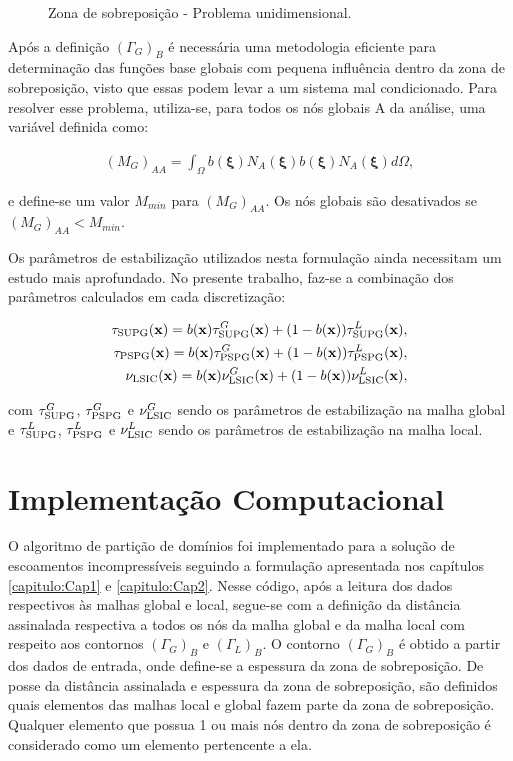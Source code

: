 \documentclass[tese_patricia]{subfiles}
\begin{document}
\begin{figure}[!htb]
	\caption{Zona de sobreposição - Problema unidimensional. }
	\label{fig:ZonadeSobreposicao}
\end{figure}


Após a definição $(\Gamma_{G})_{B}$ é necessária uma metodologia eficiente para determinação das funções base globais com pequena influência dentro da zona de sobreposição, visto que essas podem levar a um sistema mal condicionado. Para resolver esse problema, utiliza-se, para todos os n\'os globais A da análise, uma variável definida como:

\begin{align}
(M_{G})_{AA} = \int_{\Omega}b(\bm{\xi})N_{A}(\bm{\xi})b(\bm{\xi})N_{A}(\bm{\xi})d\Omega, \label{eq:influence}
\end{align}

\noindent e define-se um valor $M_{min}$ para $(M_{G})_{AA}$. Os n\'os globais s\~ao desativados se $(M_{G})_{AA} < M_{min}$.

Os parâmetros de estabilização utilizados nesta formulação ainda necessitam um estudo mais aprofundado. No presente trabalho, faz-se a combinação dos parâmetros calculados em cada discretização:

\begin{align}
\tau_{\mathrm{SUPG}}(\mathbf{x}) =  b(\mathbf{x})\tau_{\mathrm{SUPG}}^{G}(\mathbf{x}) + (1-b(\mathbf{x}))\tau_{\mathrm{SUPG}}^{L}(\mathbf{x}),\\
\tau_{\mathrm{PSPG}}(\mathbf{x}) =  b(\mathbf{x})\tau_{\mathrm{PSPG}}^{G}(\mathbf{x}) + (1-b(\mathbf{x}))\tau_{\mathrm{PSPG}}^{L}(\mathbf{x}),\\
\nu_{\mathrm{LSIC}}(\mathbf{x}) =  b(\mathbf{x})\nu_{\mathrm{LSIC}}^{G}(\mathbf{x}) + (1-b(\mathbf{x}))\nu_{\mathrm{LSIC}}^{L}(\mathbf{x}),
\end{align}

\noindent com $\tau_{\mathrm{SUPG}}^{G}$, $\tau_{\mathrm{PSPG}}^{G}$ e $\nu_{\mathrm{LSIC}}^{G}$ sendo os parâmetros de estabilização na malha global e $\tau_{\mathrm{SUPG}}^{L}$, $\tau_{\mathrm{PSPG}}^{L}$ e  $\nu_{\mathrm{LSIC}}^{L}$ sendo os parâmetros de estabilização na malha local.


\section{Implementação Computacional}

O algoritmo de partição de domínios foi implementado para a solução de escoamentos incompressíveis seguindo a formulação apresentada nos capítulos \ref{capitulo:Cap1} e \ref{capitulo:Cap2}. Nesse código, após a leitura dos dados respectivos às malhas global e local, segue-se com a definição da distância assinalada respectiva a todos os nós da malha global e da malha local com respeito aos contornos $(\Gamma_{G})_{B}$ e $(\Gamma_{L})_{B}$. O contorno  $(\Gamma_{G})_{B}$ é obtido a partir dos dados de entrada, onde define-se a espessura da zona de sobreposição. De posse da distância assinalada e espessura da zona de sobreposição, são definidos quais elementos das malhas local e global fazem parte da zona de sobreposição. Qualquer elemento que possua 1 ou mais nós dentro da zona de sobreposição é considerado como um elemento pertencente a ela.
\end{document}
